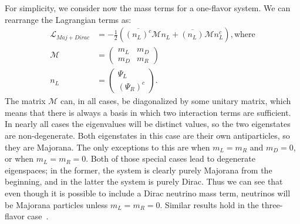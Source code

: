 For simplicity, we consider now the mass terms for a one-flavor system.   We can rearrange the Lagrangian terms as:
\begin{subequations}\begin{align}
\mathcal{L}_{Maj+Dirac}&= -\frac{1}{2} \left(\overline{\left(n_L\right)^c} \mathcal{M} n_L + \overline{\left(n_L\right)^{}} \mathcal{M} n_L^c\right), \text{where}\\
\mathcal{M}&= \begin{pmatrix}m_L & m_D \\ m_D & m_R \end{pmatrix}\\
n_L &= \begin{pmatrix} \Psi_L \\ \left(\Psi_R\right)^c \end{pmatrix}.
\end{align}\end{subequations}
The matrix $\mathcal{M}$ can, in all cases, be diagonalized by some unitary matrix, which means that there is always a basis in which two interaction terms are sufficient.  In nearly all cases the eigenvalues will be distinct values, so the two eigenstates are non-degenerate.  Both eigenstates in this case are their own antiparticles, so they are Majorana.  The only exceptions to this are when $m_L = m_R$ and $m_D = 0$, or when $m_L = m_R = 0$.  Both of those special cases lead to degenerate eigenspaces; in the former, the system is clearly purely Majorana from the beginning, and in the latter the system is purely Dirac.  Thus we can see that even though it is possible to include a Dirac neutrino mass term, neutrinos will be Majorana particles unless $m_L = m_R = 0$.  Similar results hold in the three-flavor case~\cite{RMPbb0n}.

